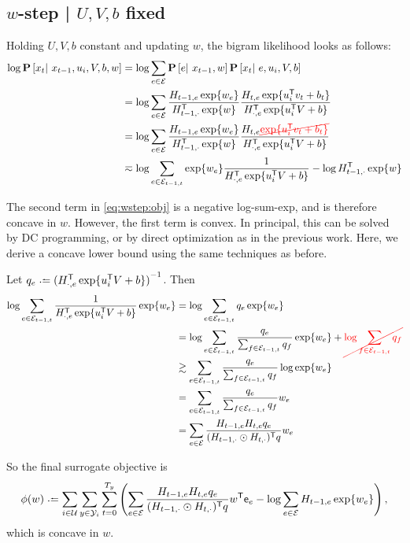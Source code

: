 \documentclass{article}
\newcommand{\ccancel}[2][black]{\color{#1}\cancel{#2}\normalcolor}
\def\e{\ensuremath{\mathsf{e}}}
\def\E{\ensuremath{\mathcal{E}}}
\def\U{\ensuremath{\mathcal{U}}}
\begin{document}
\subsection{$w$-step | $U, V, b$ fixed}
Holding $U, V, b$ constant and updating $w$, the bigram likelihood looks as follows:
\begin{align}
\log\P\left[x_t \given x_{t-1}, u_i, V, b, w\right] &= \log\sum_{e\in \E} \P\left[e \given x_{t-1}, w \right]\P\left[x_t \given e, u_i, V, b \right]\notag\\
&= \log\sum_{e\in \E} \frac{H_{t-1,e} \exp\{w_e\} }{H_{t-1,\cdot}\trans \exp\{w\}} \frac{H_{t,e} \exp\{u_i\trans v_t + b_t \} }{H_{\cdot,e}\trans \exp\{u_i\trans V + b \} }\notag\\
&= \log\sum_{e\in \E} \frac{H_{t-1,e} \exp\{w_e\} }{H_{t-1,\cdot}\trans \exp\{w\}} \frac{H_{t,e} \ccancel[red]{\exp\{u_i\trans v_t + b_t \}} }{H_{\cdot,e}\trans \exp\{u_i\trans V + b \} }\notag\\
&\eqsim \log\sum_{e\in \E_{t-1,t}} \exp\{w_e\} \frac{1}{H_{\cdot,e}\trans \exp\{u_i\trans V + b \} } - \log H_{t-1,\cdot}\trans \exp\{w\} \label{eq:wstep:obj}
\end{align}

The second term in \cref{eq:wstep:obj} is a negative log-sum-exp, and is therefore concave in $w$.  However, the first term is convex.  In principal, this can be solved by DC
programming, or by direct optimization as in the previous work.  Here, we derive a concave lower bound using the same techniques as before.

Let $q_e \defeq {(H_{\cdot, e}\trans \exp\{u_i\trans V + b\})}^{-1}$.  Then
\begin{align}
\log\sum_{e \in \E_{t-1,t}} \frac{1}{H_{\cdot, e}\trans \exp\{u_i \trans V + b\} } \exp\{w_e\} &= \log\sum_{e \in \E_{t-1,t}} q_e \exp\{w_e\} \notag\\
&= \log\sum_{e \in \E_{t-1,t}} \frac{q_e}{\sum_{f \in \E_{t-1,t}} q_f} \exp\{w_e\} + \ccancel[red]{\log\sum_{f\in\E_{t-1,t}} q_f} \notag\\
&\gtrsim \sum_{e\in \E_{t-1,t}} \frac{q_e}{\sum_{f\in\E_{t-1,t}} q_f} \log\exp\{w_e\}\notag\\
&= \sum_{e\in \E_{t-1,t}} \frac{q_e }{\sum_{f\in\E_{t-1,t}} q_f}w_e \notag\\
&= \sum_{e\in\E} \frac{H_{t-1,e}H_{t,e} q_e}{ (H_{t-1,\cdot} \odot H_{t, \cdot})\trans q} w_e\label{eq:wstep:concave}
\end{align}

So the final surrogate objective is
\begin{equation}
\phi(w) \defeq \sum_{i\in\U}\sum_{y\in\Y_i}\sum_{t=0}^{T_y} \left(\sum_{e\in\E} \frac{H_{t-1,e} H_{t,e} q_e }{ (H_{t-1,\cdot} \odot H_{t, \cdot})\trans q }w\trans \e_e - 
\log \sum_{e \in \E} H_{t-1, e} \exp\{w_e\}\right), \label{eq:wstep:surrogate}
\end{equation}
which is concave in $w$.
\end{document}
